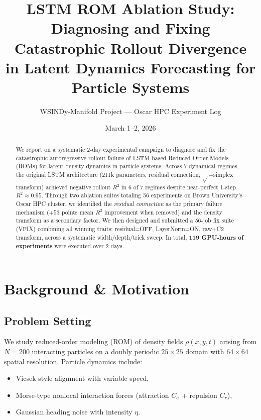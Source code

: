 \documentclass[11pt,letterpaper]{article}
\title{%
  \textbf{LSTM ROM Ablation Study:}\\
  \large Diagnosing and Fixing Catastrophic Rollout Divergence\\
  in Latent Dynamics Forecasting for Particle Systems%
}
\author{WSINDy-Manifold Project — Oscar HPC Experiment Log}
\date{March 1--2, 2026}
\newcommand{\Rtwo}{R^2}
\begin{document}
\maketitle

\begin{abstract}
We report on a systematic 2-day experimental campaign to diagnose and fix the
catastrophic autoregressive rollout failure of LSTM-based Reduced Order Models (ROMs)
for latent density dynamics in particle systems.  
Across 7 dynamical regimes, the original LSTM architecture (211k parameters, residual
connection, $\sqrt{}$+simplex transform) achieved negative rollout $\Rtwo$ in 6 of 7
regimes despite near-perfect 1-step $\Rtwo\!\approx\!0.95$.
Through two ablation suites totaling 56 experiments on Brown University's Oscar HPC cluster,
we identified the \emph{residual connection} as the primary failure mechanism
($+53$ points mean $\Rtwo$ improvement when removed) and the density transform as a
secondary factor.  We then designed and submitted a 56-job fix suite (VFIX) combining
all winning traits: residual=OFF, LayerNorm=ON, raw+C2 transform, across a systematic
width/depth/trick sweep.  In total, \textbf{119 GPU-hours of experiments} were executed
over 2 days.
\end{abstract}

\tableofcontents
\newpage

\section{Background \& Motivation}
\label{sec:background}

\subsection{Problem Setting}
We study reduced-order modeling (ROM) of density fields $\rho(x,y,t)$ arising
from $N\!=\!200$ interacting particles on a doubly periodic $25\!\times\!25$
domain with $64\!\times\!64$ spatial resolution.  Particle dynamics include:
\begin{itemize}[nosep]
  \item Vicsek-style alignment with variable speed,
  \item Morse-type nonlocal interaction forces (attraction $C_a$ + repulsion $C_r$),
  \item Gaussian heading noise with intensity $\eta$.
\end{itemize}
\end{document}

